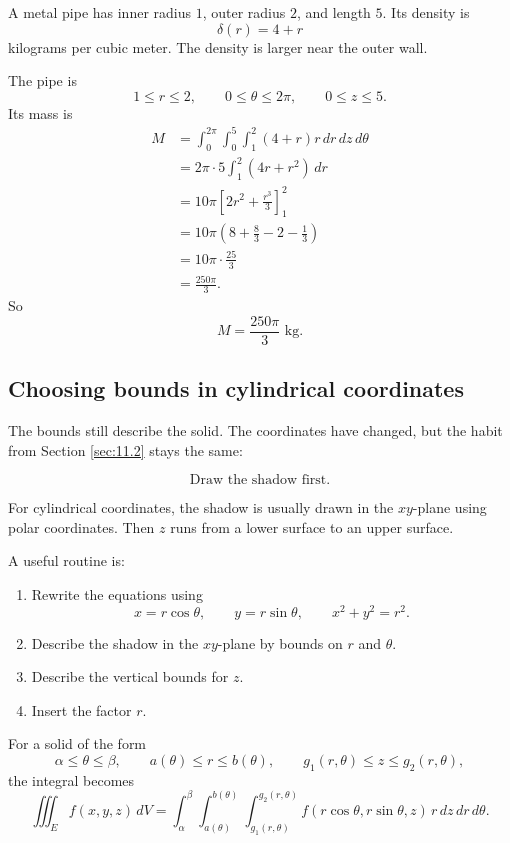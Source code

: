 \begin{example}
A metal pipe has inner radius \(1\), outer radius \(2\), and length \(5\).  Its density is
\[
    \delta(r)=4+r
\]
kilograms per cubic meter.  The density is larger near the outer wall.

The pipe is
\[
    1\le r\le2,\qquad 0\le\theta\le2\pi,\qquad 0\le z\le5.
\]
Its mass is
\[
\begin{aligned}
M
&=
\int_0^{2\pi}\int_0^5\int_1^2 (4+r)r\,dr\,dz\,d\theta\\
&=
2\pi\cdot5\int_1^2(4r+r^2)\,dr\\
&=
10\pi\left[2r^2+\frac{r^3}{3}\right]_1^2\\
&=
10\pi\left(8+\frac83-2-\frac13\right)\\
&=
10\pi\cdot\frac{25}{3}\\
&=
\frac{250\pi}{3}.
\end{aligned}
\]
So
\[
\boxed{
    M=\frac{250\pi}{3}\text{ kg}.
}
\]
\end{example}

\subsection{Choosing bounds in cylindrical coordinates}

The bounds still describe the solid.  The coordinates have changed, but the habit from
Section \ref{sec:11.2} stays the same:

\[
\boxed{
    \text{Draw the shadow first.}
}
\]

For cylindrical coordinates, the shadow is usually drawn in the \(xy\)-plane using polar
coordinates.  Then \(z\) runs from a lower surface to an upper surface.

A useful routine is:

\begin{enumerate}
\item Rewrite the equations using
\[
    x=r\cos\theta,\qquad y=r\sin\theta,\qquad x^2+y^2=r^2.
\]

\item Describe the shadow in the \(xy\)-plane by bounds on \(r\) and \(\theta\).

\item Describe the vertical bounds for \(z\).

\item Insert the factor \(r\).
\end{enumerate}

For a solid of the form
\[
    \alpha\le\theta\le\beta,
    \qquad
    a(\theta)\le r\le b(\theta),
    \qquad
    g_1(r,\theta)\le z\le g_2(r,\theta),
\]
the integral becomes
\[
\boxed{
\iiint_E f(x,y,z)\,dV
=
\int_\alpha^\beta
\int_{a(\theta)}^{b(\theta)}
\int_{g_1(r,\theta)}^{g_2(r,\theta)}
f(r\cos\theta,r\sin\theta,z)\,r\,dz\,dr\,d\theta.
}
\]

